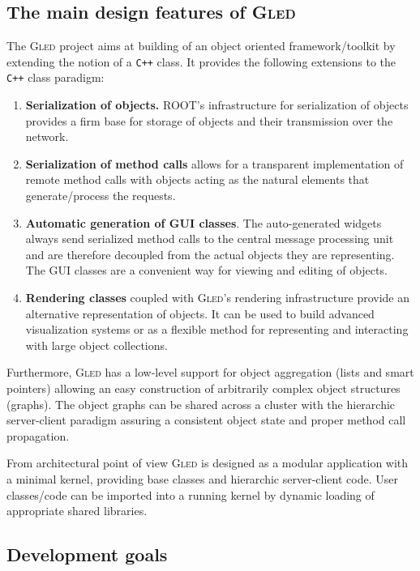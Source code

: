 \documentclass[final]{siamltex}
\def\gled{\textsc{Gled}\xspace}
\def\smalltt#1{{\small\texttt{#1}}}
\begin{document}
\subsection{The main design features of \gled}

The \gled project aims at building of an object oriented
framework/toolkit by extending the notion of a \smalltt{C++} class. It
provides the following extensions to the \smalltt{C++} class paradigm:

\begin{enumerate}
\item \textbf{Serialization of objects.} ROOT's infrastructure for
  serialization of objects provides a firm base for storage of objects
  and their transmission over the network.
\item \textbf{Serialization of method calls} allows for a transparent
  implementation of remote method calls with objects acting as the
  natural elements that generate/process the requests.
\item \textbf{Automatic generation of GUI classes}. The auto-generated
  widgets always send serialized method calls to the central message
  processing unit and are therefore decoupled from the actual objects
  they are representing. The GUI classes are a convenient way for
  viewing and editing of objects.
\item \textbf{Rendering classes} coupled with \gled's rendering
  infrastructure provide an alternative representation of objects. It
  can be used to build advanced visualization systems or as a
  flexible method for representing and interacting with large object
  collections.
\end{enumerate}

Furthermore, \gled has a low-level support for object aggregation (lists
and smart pointers) allowing an easy construction of arbitrarily
complex object structures (graphs). The object graphs can be shared across a
cluster with the hierarchic server-client paradigm assuring a consistent
object state and proper method call propagation.

From architectural point of view \gled is designed as a modular
application with a minimal kernel, providing base classes and
hierarchic server-client code. User classes/code can be imported into
a running kernel by dynamic loading of appropriate shared libraries.

\subsection{Development goals}
\end{document}
